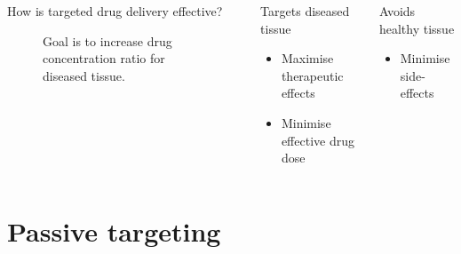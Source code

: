 \documentclass[aspectratio=169,compress]{beamer}
\begin{document}
\begin{frame}{\subsecname}
\begin{columns}
\begin{block}{How is targeted drug delivery effective?}
\begin{figure}
          \caption{Goal is to increase drug concentration ratio for diseased tissue.}
        \end{figure}
      \end{block}

      \begin{block}{Targets diseased tissue}
        \begin{itemize}
          \item Maximise therapeutic effects
          \item Minimise effective drug dose
        \end{itemize}
      \end{block}

      \begin{block}{Avoids healthy tissue}
        \begin{itemize}
          \item Minimise side-effects
        \end{itemize}
      \end{block}

  \end{columns}
\end{frame}

\section{Passive targeting}
\end{document}
